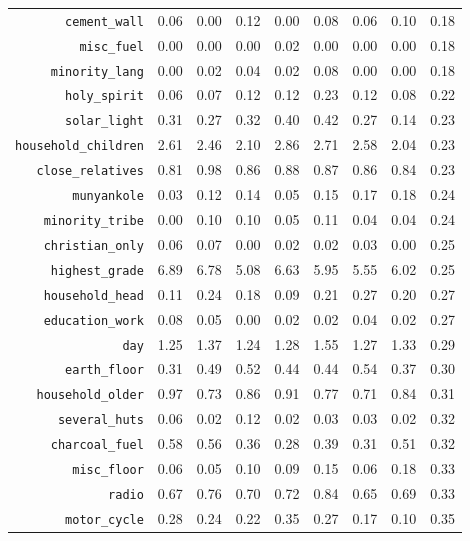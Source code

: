 \begin{longtable}{rrrrrrrrr}
  {\texttt{cement\_wall}} & 0.06 & 0.00 & 0.12 & 0.00 & 0.08 & 0.06 & 0.10 & 0.18 \\ 
  {\texttt{misc\_fuel}} & 0.00 & 0.00 & 0.00 & 0.02 & 0.00 & 0.00 & 0.00 & 0.18 \\ 
  {\texttt{minority\_lang}} & 0.00 & 0.02 & 0.04 & 0.02 & 0.08 & 0.00 & 0.00 & 0.18 \\ 
  {\texttt{holy\_spirit}} & 0.06 & 0.07 & 0.12 & 0.12 & 0.23 & 0.12 & 0.08 & 0.22 \\ 
  {\texttt{solar\_light}} & 0.31 & 0.27 & 0.32 & 0.40 & 0.42 & 0.27 & 0.14 & 0.23 \\ 
  {\texttt{household\_children}} & 2.61 & 2.46 & 2.10 & 2.86 & 2.71 & 2.58 & 2.04 & 0.23 \\ 
  {\texttt{close\_relatives}} & 0.81 & 0.98 & 0.86 & 0.88 & 0.87 & 0.86 & 0.84 & 0.23 \\ 
  {\texttt{munyankole}} & 0.03 & 0.12 & 0.14 & 0.05 & 0.15 & 0.17 & 0.18 & 0.24 \\ 
  {\texttt{minority\_tribe}} & 0.00 & 0.10 & 0.10 & 0.05 & 0.11 & 0.04 & 0.04 & 0.24 \\ 
  {\texttt{christian\_only}} & 0.06 & 0.07 & 0.00 & 0.02 & 0.02 & 0.03 & 0.00 & 0.25 \\ 
  {\texttt{highest\_grade}} & 6.89 & 6.78 & 5.08 & 6.63 & 5.95 & 5.55 & 6.02 & 0.25 \\ 
  {\texttt{household\_head}} & 0.11 & 0.24 & 0.18 & 0.09 & 0.21 & 0.27 & 0.20 & 0.27 \\ 
  {\texttt{education\_work}} & 0.08 & 0.05 & 0.00 & 0.02 & 0.02 & 0.04 & 0.02 & 0.27 \\ 
  {\texttt{day}} & 1.25 & 1.37 & 1.24 & 1.28 & 1.55 & 1.27 & 1.33 & 0.29 \\ 
  {\texttt{earth\_floor}} & 0.31 & 0.49 & 0.52 & 0.44 & 0.44 & 0.54 & 0.37 & 0.30 \\ 
  {\texttt{household\_older}} & 0.97 & 0.73 & 0.86 & 0.91 & 0.77 & 0.71 & 0.84 & 0.31 \\ 
  {\texttt{several\_huts}} & 0.06 & 0.02 & 0.12 & 0.02 & 0.03 & 0.03 & 0.02 & 0.32 \\ 
  {\texttt{charcoal\_fuel}} & 0.58 & 0.56 & 0.36 & 0.28 & 0.39 & 0.31 & 0.51 & 0.32 \\ 
  {\texttt{misc\_floor}} & 0.06 & 0.05 & 0.10 & 0.09 & 0.15 & 0.06 & 0.18 & 0.33 \\ 
  {\texttt{radio}} & 0.67 & 0.76 & 0.70 & 0.72 & 0.84 & 0.65 & 0.69 & 0.33 \\ 
  {\texttt{motor\_cycle}} & 0.28 & 0.24 & 0.22 & 0.35 & 0.27 & 0.17 & 0.10 & 0.35 \\ 

\end{longtable}
